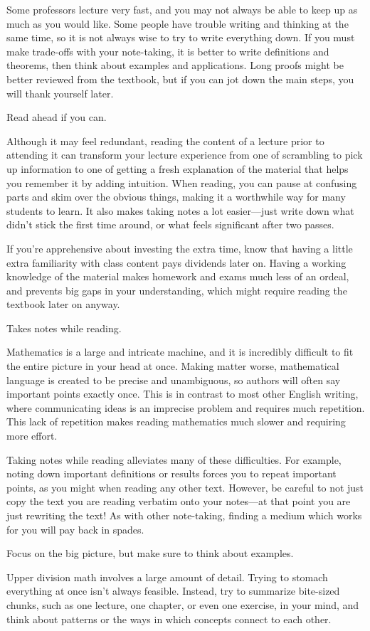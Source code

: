 \documentclass[../notes.tex]{subfiles}
\begin{document}
Some professors lecture very fast, and you may not always be able to keep up as much as you would like. Some people have trouble writing and thinking at the same time, so it is not always wise to try to write everything down. If you must make trade-offs with your note-taking, it is better to write definitions and theorems, then think about examples and applications. Long proofs might be better reviewed from the textbook, but if you can jot down the main steps, you will thank yourself later.
\begin{corollary}
    Read ahead if you can.
\end{corollary}
Although it may feel redundant, reading the content of a lecture prior to attending it can transform your lecture experience from one of scrambling to pick up information to one of getting a fresh explanation of the material that helps you remember it by adding intuition. When reading, you can pause at confusing parts and skim over the obvious things, making it a worthwhile way for many students to learn. It also makes taking notes a lot easier---just write down what didn't stick the first time around, or what feels significant after two passes.

If you're apprehensive about investing the extra time, know that having a little extra familiarity with class content pays dividends later on. Having a working knowledge of the material makes homework and exams much less of an ordeal, and prevents big gaps in your understanding, which might require reading the textbook later on anyway.
\begin{corollary}
    Takes notes while reading.
\end{corollary}
Mathematics is a large and intricate machine, and it is incredibly difficult to fit the entire picture in your head at once. Making matter worse, mathematical language is created to be precise and unambiguous, so authors will often say important points exactly once. This is in contrast to most other English writing, where communicating ideas is an imprecise problem and requires much repetition. This lack of repetition makes reading mathematics much slower and requiring more effort.

Taking notes while reading alleviates many of these difficulties. For example, noting down important definitions or results forces you to repeat important points, as you might when reading any other text. However, be careful to not just copy the text you are reading verbatim onto your notes---at that point you are just rewriting the text! As with other note-taking, finding a medium which works for you will pay back in spades.
\begin{proposition}
    Focus on the big picture, but make sure to think about examples.
\end{proposition}
Upper division math involves a large amount of detail. Trying to stomach everything at once isn't always feasible. Instead, try to summarize bite-sized chunks, such as one lecture, one chapter, or even one exercise, in your mind, and think about patterns or the ways in which concepts connect to each other.
\end{document}

